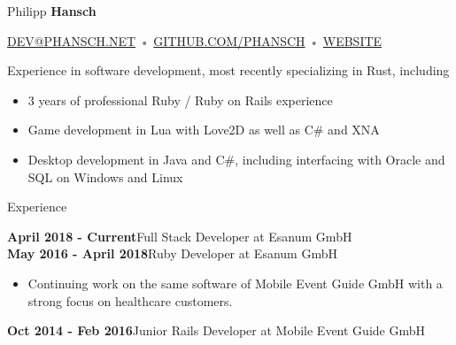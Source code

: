 \documentclass[12pt]{article}
\begin{document}
\thispagestyle{empty}



{\Huge Philipp \textbf{Hansch}}

{\footnotesize
  \textcolor{Gray}{
    \href{mailto:dev@phansch.net}{\uppercase{dev@phansch.net}}
    •
    \href{http://github.com/phansch}{\uppercase{github.com/phansch}}
    •
    \href{http://phansch.net}{\uppercase{Website}}
  }
}

\vspace{0.5cm}

Experience in software development, most recently specializing in Rust, including

\begin{itemize}
  \setlength{\itemsep}{0cm}
  \setlength{\parskip}{0cm}
  \item 3  years of professional Ruby / Ruby on Rails experience
  \item Game development in Lua with Love2D as well as C\# and XNA
  \item Desktop development in Java and C\#, including interfacing with Oracle and SQL on Windows and Linux
\end{itemize}

{\Large Experience}

\textbf{April 2018 - Current}\hfill Full Stack Developer at Esanum GmbH
\\

\textbf{May 2016 - April 2018}\hfill Ruby Developer at Esanum GmbH

\begin{itemize}
  \setlength{\itemsep}{0cm}
  \setlength{\parskip}{0cm}

  \item Continuing work on the same software of Mobile Event Guide GmbH with a strong focus on healthcare customers.
\end{itemize}

\textbf{Oct 2014 - Feb 2016}\hfill Junior Rails Developer at Mobile Event Guide GmbH
\end{document}
